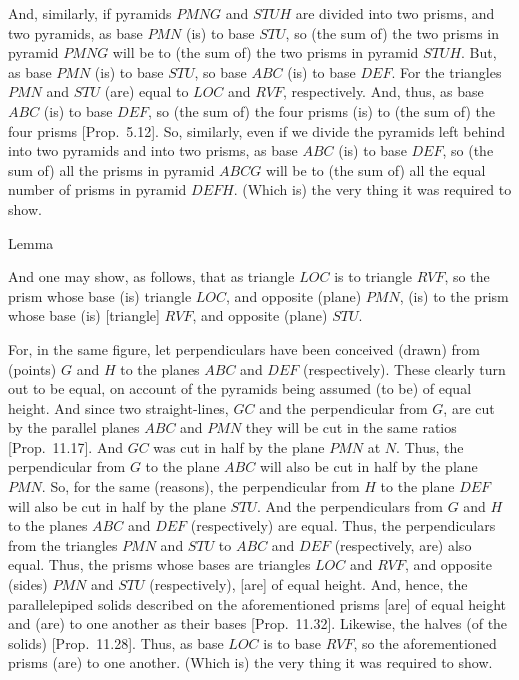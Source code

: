 And, similarly, if pyramids $PMNG$ and $STUH$ are divided into two prisms, and
two pyramids, as base $PMN$ (is) to base $STU$, so (the sum of) the  two prisms in pyramid
$PMNG$ will be to (the sum of) the  two prisms in pyramid $STUH$. But, as base $PMN$ (is) to
base $STU$, so base $ABC$ (is) to base $DEF$. For  the triangles $PMN$ and
$STU$ (are) equal to $LOC$ and $RVF$, respectively. And, thus, as base $ABC$ (is)
to base $DEF$, so (the sum of) the four prisms (is) to (the sum of) the four prisms [Prop.~5.12].
So, similarly, even if we  divide the pyramids left behind into two pyramids
and into two prisms, as base $ABC$ (is) to base $DEF$, so (the sum of) all the prisms in pyramid
$ABCG$ will be to (the sum of) all the equal number of prisms in pyramid $DEFH$. (Which is) the
very thing it was required to show.


\begin{center}
\large{Lemma}
\end{center}

And one may show, as follows, that as triangle $LOC$ is to triangle $RVF$, so the prism whose base (is) triangle $LOC$,
and opposite (plane) $PMN$, (is) to the prism whose base (is) [triangle] $RVF$, and opposite
(plane) $STU$. 

For, in the same figure, let perpendiculars have been conceived (drawn) from (points)
$G$ and $H$ to the planes $ABC$ and $DEF$ (respectively). These clearly turn
out to be equal, on account of the pyramids being assumed (to be) of equal height. And
since two straight-lines, $GC$ and the perpendicular from $G$, are cut by the parallel
planes $ABC$ and $PMN$ they will be cut in the same ratios [Prop.~11.17]. And $GC$ was cut in half by the plane $PMN$ at $N$. Thus, the perpendicular
from $G$ to the plane $ABC$ will also be cut in half by the plane $PMN$. So, for the same
(reasons), the perpendicular from $H$ to the plane $DEF$ will also be cut in half by the
plane $STU$. And  the perpendiculars from $G$ and $H$ to the planes $ABC$ and $DEF$
(respectively) are equal. Thus, the perpendiculars from the triangles $PMN$ and $STU$
to $ABC$ and $DEF$ (respectively, are) also equal. Thus, the prisms whose bases are triangles
$LOC$ and $RVF$, and opposite (sides) $PMN$ and $STU$ (respectively), [are] of equal height.
And, hence, the parallelepiped solids described on the aforementioned prisms
[are] of equal height and (are) to one another as their bases [Prop.~11.32]. Likewise, the halves (of
the solids) [Prop.~11.28].  Thus, as base $LOC$ is to base $RVF$, so the
aforementioned prisms (are) to one another. (Which is) the very thing it was required to show.

